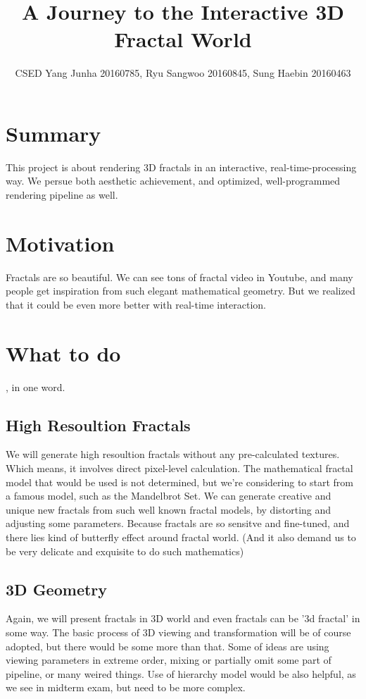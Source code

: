 \documentclass[a4paper]{article}
\title{A Journey to the Interactive 3D Fractal World}
\author{CSED Yang Junha 20160785, Ryu Sangwoo 20160845, Sung Haebin 20160463}
\begin{document}
\maketitle
\section{Summary}
This project is about rendering 3D fractals in an interactive, real-time-processing way.
We persue both aesthetic achievement, and optimized, well-programmed rendering pipeline as well.
\section{Motivation}
Fractals are so beautiful.
We can see tons of fractal video in Youtube, and many people get inspiration from such elegant mathematical geometry.
But we realized that it could be even more better with real-time interaction.
\section{What to do}
, in one word.
\subsection{High Resoultion Fractals}
We will generate high resoultion fractals without any pre-calculated textures.
Which means, it involves direct pixel-level calculation.
The mathematical fractal model that would be used is not determined, but we're considering to start from a famous model, such as the Mandelbrot Set.
We can generate creative and unique new fractals from such well known fractal models, by distorting and adjusting some parameters.
Because fractals are so sensitve and fine-tuned, and there lies kind of butterfly effect around fractal world.
(And it also demand us to be very delicate and exquisite to do such mathematics)
\subsection{3D Geometry}
Again, we will present fractals in 3D world and even fractals can be '3d fractal' in some way.
The basic process of 3D viewing and transformation will be of course adopted, but there would be some more than that.
Some of ideas are using viewing parameters in extreme order, mixing or partially omit some part of pipeline, or many weired things.
Use of hierarchy model would be also helpful, as we see in midterm exam, but need to be more complex.
\end{document}
